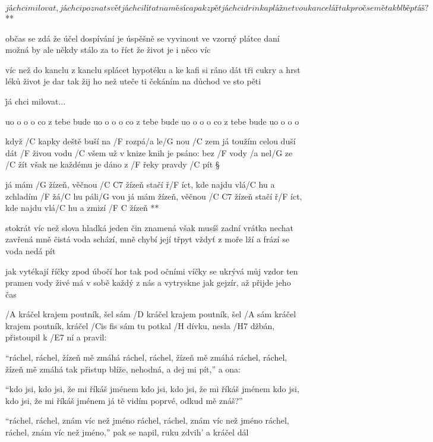 \R  \[ já chci milovat, já chci poznat svět
    já chci lítat na měsíc a pak zpět
    já chci drink a pláž ne tvou kancelář
    tak proč se mě tak blbě ptáš? \] **

občas se zdá že účel dospívání
je úspěšně se vyvinout ve vzorný plátce daní
možná by ale někdy stálo za to říct
že život je i něco víc \s

víc než do kanclu z kanclu splácet hypotéku
a ke kafi si ráno dát tři cukry a hrst léků
život je dar tak žij ho než uteče ti
čekáním na důchod ve sto pěti

\r já chci milovat...

uo o o o co z tebe bude
uo o o o co z tebe bude
uo o o o co z tebe bude
uo o o o

\rr




když /C kapky deště buší na /F rozpá/a le/G nou /C zem
já toužím celou duší dát /F živou vodu /C všem
už v knize knih je psáno: bez /F vody /a nel/G ze /C žít
však ne každému je dáno z /F řeky pravdy /C pít \S

\R já mám /G žízeň, věčnou /{C C7} žízeň
   stačí ř/F íct, kde najdu vlá/C hu a zchladím /F žá/C hu páli/G vou
   já mám žízeň, věčnou /{C C7} žízeň
   stačí ř/F íct, kde najdu vlá/C hu a zmizí /{F C} žízeň **

stokrát víc než slova hladká jeden čin znamená
však musíš zadní vrátka nechat zavřená
mně čistá voda schází, mně chybí její třpyt
vždyť z moře lží a frází se voda nedá pít \s

jak vytékají říčky zpod úbočí hor
tak pod očními víčky se ukrývá můj vzdor
ten pramen vody živé má v sobě každý z nás
a vytryskne jak gejzír, až přijde jeho čas




/A kráčel krajem poutník, šel sám
/D kráčel krajem poutník, šel /A sám
kráčel krajem poutník, kráčel /{Cis fis} sám
tu potkal /H dívku, nesla /H7 džbán, přistoupil k /E7 ní a pravil: \s

``ráchel, ráchel, žízeň mě zmáhá
ráchel, ráchel, žízeň mě zmáhá
ráchel, ráchel, žízeň mě zmáhá
tak přistup blíže, nehodná, a dej mi pít,'' a ona: \s

``kdo jsi, kdo jsi, že mi říkáš jménem
kdo jsi, kdo jsi, že mi říkáš jménem
kdo jsi, kdo jsi, že mi říkáš jménem
já tě vidím poprvé, odkud mě znáš?'' \s

``ráchel, ráchel, znám víc než jméno
ráchel, ráchel, znám víc než jméno
ráchel, ráchel, znám víc než jméno,''
pak se napil, ruku zdvih' a kráčel dál \s

